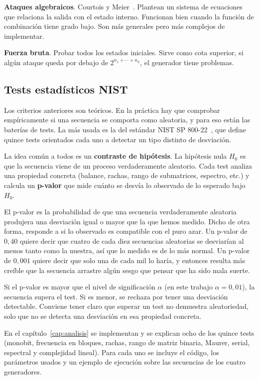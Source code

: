 \textbf{Ataques algebraicos}. Courtois y Meier~\cite{courtois2003}.
Plantean un sistema de ecuaciones que relaciona la salida con el estado interno. Funcionan bien cuando la función de combinación tiene grado bajo.
Son más generales pero más complejos de implementar.

\textbf{Fuerza bruta}. Probar todos los estados iniciales. Sirve como cota superior, si algún ataque queda por debajo de $2^{n_1 + \cdots + n_k}$, el generador tiene problemas.

\subsection{Tests estadísticos NIST}

Los criterios anteriores son teóricos. En la práctica hay que comprobar empíricamente si una secuencia se comporta como aleatoria,
y para eso están las baterías de tests. La más usada es la del estándar NIST SP 800-22~\cite{nist2010},
que define quince tests orientados cada uno a detectar un tipo distinto de desviación.

La idea común a todos es un \textbf{contraste de hipótesis}. La hipótesis nula $H_0$ es que la secuencia viene de un proceso verdaderamente aleatorio.
Cada test analiza una propiedad concreta (balance, rachas, rango de submatrices, espectro, etc.) y calcula un \textbf{p-valor} que mide cuánto se desvía lo observado de lo esperado bajo $H_0$.

El p-valor es la probabilidad de que una secuencia verdaderamente aleatoria produjera una desviación igual o mayor que la que hemos medido.
Dicho de otra forma, responde a si lo observado es compatible con el puro azar.
Un p-valor de $0{,}40$ quiere decir que cuatro de cada diez secuencias aleatorias se desviarían al menos tanto como la nuestra,
así que lo medido es de lo más normal. Un p-valor de $0{,}001$ quiere decir que solo una de cada mil lo haría,
y entonces resulta más creíble que la secuencia arrastre algún sesgo que pensar que ha sido mala suerte.

Si el p-valor es mayor que el nivel de significación $\alpha$ (en este trabajo $\alpha = 0{,}01$), la secuencia supera el test.
Si es menor, se rechaza por tener una desviación detectable. Conviene tener claro que superar un test no demuestra aleatoriedad,
solo que no se detecta una desviación en esa propiedad concreta.

En el capítulo~\ref{cap:analisis} se implementan y se explican ocho de los quince tests (monobit, frecuencia en bloques, rachas, rango de matriz binaria, Maurer, serial, espectral y complejidad lineal).
Para cada uno se incluye el código, los parámetros usados y un ejemplo de ejecución sobre las secuencias de los cuatro generadores.
